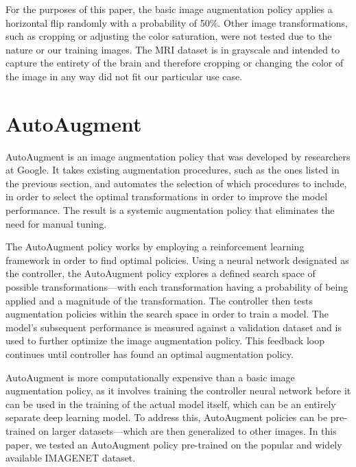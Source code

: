 \documentclass [MS] {uclathes}
\begin{document}
For the purposes of this paper, the basic image augmentation policy applies a horizontal flip randomly with a 
probability of 50\%. Other image transformations, such as cropping or adjusting the color saturation, were not tested 
due to the nature or our training images. The MRI dataset is in grayscale and intended to capture the entirety of the 
brain and therefore cropping or changing the color of the image in any way did not fit our particular use case. 

\section{AutoAugment}
AutoAugment is an image augmentation policy that was developed by researchers at Google. It takes existing augmentation 
procedures, such as the ones listed in the previous section, and automates the selection of which procedures to include,
in order to select the optimal transformations in order to improve the model performance. The result is a systemic 
augmentation policy that eliminates the need for manual tuning. 

The AutoAugment policy works by employing a reinforcement learning framework in order to find optimal policies. Using a 
neural network designated as the controller, the AutoAugment policy explores a defined search space of possible 
transformations---with each transformation having a probability of being applied and a magnitude of the transformation.
The controller then tests augmentation policies within the search space in order to train a model. The model's 
subsequent performance is measured against a validation dataset and is used to further optimize the image augmentation 
policy. This feedback loop continues until controller has found an optimal augmentation policy.

AutoAugment is more computationally expensive than a basic image augmentation policy, as it involves training the 
controller neural network before it can be used in the training of the actual model itself, which can be an entirely 
separate deep learning model. To address this, AutoAugment policies can be pre-trained on larger datasets---which are 
then generalized to other images. In this paper, we tested an AutoAugment policy pre-trained on the popular and widely 
available IMAGENET dataset.
\end{document}
